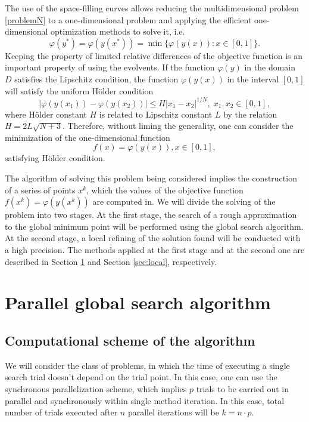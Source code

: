 \documentclass[runningheads]{llncs}
\begin{document}
The use of the space-filling curves allows reducing the multidimensional problem \ref{problemN} to a one-dimensional problem and applying the efficient one-dimensional optimization methods to solve it, i.e. 
\begin{equation} \label{problem_ref}
\varphi(y^*) = \varphi(y(x^*)) = \min{\{ \varphi(y(x)): x \in [0, 1] \}}.
\end{equation}
Keeping the property of limited relative differences of the objective function is an important property of using the evolvents. If the function $\varphi(y)$ in the domain $D$ satisfies the Lipschitz condition, the function $\varphi(y(x))$ in the interval $[0,1]$ will satisfy the uniform H{\"o}lder condition
\begin{equation} \label{holder_ref}
\left| \varphi(y(x_1)) - \varphi(y(x_2)) \right| \leq H {\left| x_1 - x_2 \right|}^{1/N}, \; x_1, x_2 \in [0,1],
\end{equation}
where H{\"o}lder constant $H$ is related to Lipschitz constant $L$ by the relation $H = 2L\sqrt{N+3}$. Therefore, without liming the generality, one can consider the minimization of the one-dimensional function 
\begin{equation} \label{minim_fun_ref}
f(x) = \varphi(y(x)), x \in [0,1],
\end{equation}
satisfying H{\"o}lder condition.

The algorithm of solving this problem being considered implies the construction of a series of points $x^k$, which the values of the objective function  $f(x^k) = \varphi(y(x^k))$ are computed in. We will divide the solving of the problem into two stages. At the first stage, the search of a rough approximation to the global minimum point will be performed using the global search algorithm. At the second stage, a local refining of the solution found will be conducted with a high precision. The methods applied at the first stage and at the second one are described in Section \ref{sec:global} and Section \ref{sec:local}, respectively.

\section{Parallel global search algorithm}\label{sec:global}
\subsection{Computational scheme of the algorithm}

We will consider the class of problems, in which the time of executing a single search trial doesn't depend on the trial point. In this case, one can use the synchronous parallelization scheme, which implies $p$ trials to be carried out in parallel and synchronously within single method iteration. In this case, total number of trials executed after $n$ parallel iterations will be $k=n \cdot p$.
\end{document}
